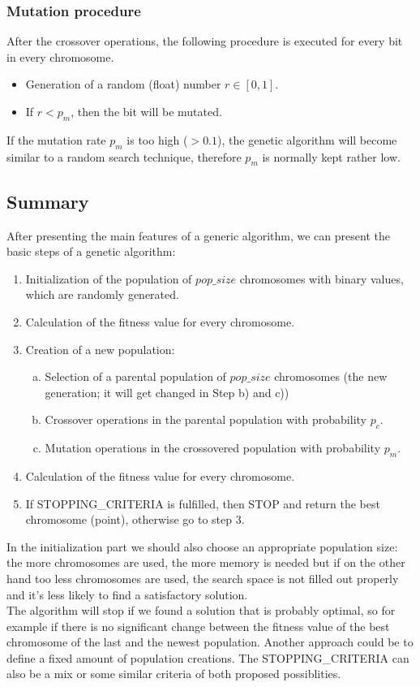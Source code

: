 \subsubsection*{Mutation procedure}
After the crossover operations, the following procedure is executed for every bit in every chromosome.
\begin{itemize}
\item Generation of a random (float) number $r\in[0,1]$.
\item If $r<p_m$, then the bit will be mutated.
\end{itemize}
If the mutation rate $p_m$ is too high ($>0.1$), the genetic algorithm will become similar to a random search technique, therefore $p_m$ is normally kept rather low.


\subsection{Summary}
After presenting the main features of a generic algorithm, we can present the basic steps of a genetic algorithm:
\begin{enumerate}[1.]
\item Initialization of the population of $pop\_size$ chromosomes with binary values, which are randomly generated.
\item Calculation of the fitness value for every chromosome.
\item Creation of a new population:
	\begin{enumerate}[a)]
	\item Selection of a parental population of $pop\_size$ chromosomes (the new generation; it will get changed in Step b) and c))
	\item Crossover operations in the parental population with probability $p_c$.
	\item Mutation operations in the crossovered population with probability $p_m$.
	\end{enumerate}
\item Calculation of the fitness value for every chromosome.
\item If STOPPING\_CRITERIA is fulfilled, then STOP and return the best chromosome (point), otherwise go to step 3.
\end{enumerate}
In the initialization part we should also choose an appropriate population size: the more chromosomes are used, the more memory is needed but if on the other hand too less chromosomes are used, the search space is not filled out properly and it's less likely to find a satisfactory solution.\\
The algorithm will stop if we found a solution that is probably optimal, so for example if there is no significant change between the fitness value of the best chromosome of the last and the newest population. Another approach could be to define a fixed amount of population creations. The STOPPING\_CRITERIA can also be a mix or some similar criteria of both proposed possiblities.\\

